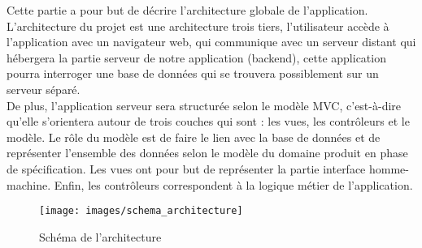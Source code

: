 Cette partie a pour but de décrire l'architecture globale de l'application.\\

L'architecture du projet est une architecture trois tiers, l'utilisateur accède à l'application avec un navigateur web, qui communique avec un serveur distant qui hébergera la partie serveur de notre application (backend), cette application pourra interroger une base de données qui se trouvera possiblement sur un serveur séparé.\\

De plus, l'application serveur sera structurée selon le modèle MVC, c'est-à-dire qu'elle s'orientera autour de trois couches qui sont : les vues, les contrôleurs et le modèle. Le rôle du modèle est de faire le lien avec la base de données et de représenter l'ensemble des données selon le modèle du domaine produit en phase de spécification. Les vues ont pour but de représenter la partie interface homme-machine. Enfin, les contrôleurs correspondent à la logique métier de l'application. 


\begin{figure}[!h]
	\begin{center}
	\texttt{[image: images/schema\_architecture]}
	\caption{\label{archi_schema} Schéma de l'architecture}
	\end{center}
\end{figure}